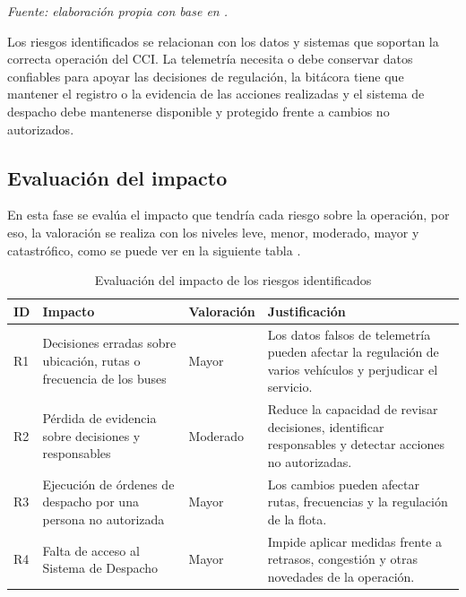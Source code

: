 \begin{flushleft}
	\footnotesize
	\textit{Fuente: elaboración propia con base en \cite{iso27005,mintic2021,transmilenio2025pesi,transmilenio2026cci}.}
\end{flushleft}

Los riesgos identificados se relacionan con los datos y sistemas que soportan la correcta operación del CCI. La telemetría necesita o debe conservar datos confiables para apoyar las decisiones de regulación, la bitácora tiene que mantener el registro o la evidencia de las acciones realizadas y el sistema de despacho debe mantenerse disponible y protegido frente a cambios no autorizados.

\subsection{Evaluación del impacto}

En esta fase se evalúa el impacto que tendría cada riesgo sobre la operación, por eso, la valoración se realiza con los niveles leve, menor, moderado, mayor y catastrófico, como se puede ver en la siguiente tabla \parencite{funcionpublica2025}.

\begin{table}[H]
	\centering
	\caption{Evaluación del impacto de los riesgos identificados}
	\label{tab:evaluacion-impacto}
	\small
	\renewcommand{\arraystretch}{1.3}
	
	\begin{tabularx}{\textwidth}{
			>{\centering\arraybackslash}p{0.8cm}
			>{\raggedright\arraybackslash}p{4.2cm}
			>{\centering\arraybackslash}p{2cm}
			Y
		}
		\toprule
		\textbf{ID} &
		\textbf{Impacto} &
		\textbf{Valoración} &
		\textbf{Justificación} \\
		\midrule
		
		R1 &
		Decisiones erradas sobre ubicación, rutas o frecuencia de los buses &
		Mayor &
		Los datos falsos de telemetría pueden afectar la regulación de varios vehículos y perjudicar el servicio. \\
		
		R2 &
		Pérdida de evidencia sobre decisiones y responsables &
		Moderado &
		Reduce la capacidad de revisar decisiones, identificar responsables y detectar acciones no autorizadas. \\
		
		R3 &
		Ejecución de órdenes de despacho por una persona no autorizada &
		Mayor &
		Los cambios pueden afectar rutas, frecuencias y la regulación de la flota. \\
		
		R4 &
		Falta de acceso al Sistema de Despacho &
		Mayor &
		Impide aplicar medidas frente a retrasos, congestión y otras novedades de la operación. \\
		
		\bottomrule
	\end{tabularx}
\end{table}

